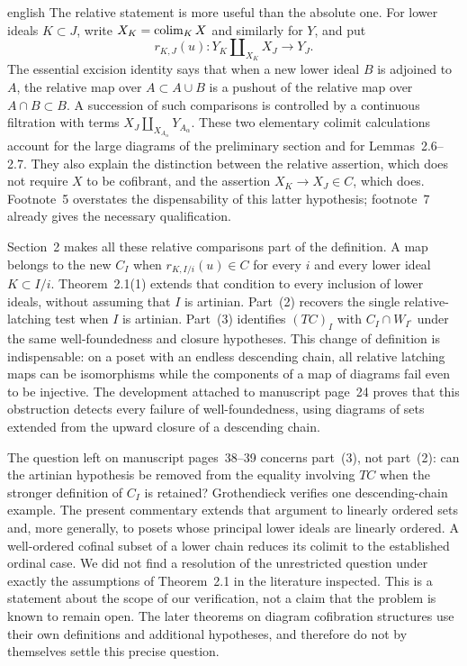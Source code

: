 \begin{otherlanguage*}{english}
The relative statement is more useful than the absolute one. For lower ideals $K\subset J$, write $X_K=\mathop{\rm colim}_{K}X$ and similarly for $Y$, and put
\[
 r_{K,J}(u):Y_K\amalg_{X_K}X_J\longrightarrow Y_J.
\]
The essential excision identity says that when a new lower ideal $B$ is adjoined to $A$, the relative map over $A\subset A\cup B$ is a pushout of the relative map over $A\cap B\subset B$. A succession of such comparisons is controlled by a continuous filtration with terms $X_J\amalg_{X_{A_\alpha}}Y_{A_\alpha}$. These two elementary colimit calculations account for the large diagrams of the preliminary section and for Lemmas~2.6--2.7. They also explain the distinction between the relative assertion, which does not require $X$ to be cofibrant, and the assertion $X_K\to X_J\in C$, which does. Footnote~5 overstates the dispensability of this latter hypothesis; footnote~7 already gives the necessary qualification.

Section~2 makes all these relative comparisons part of the definition. A map belongs to the new $C_I$ when $r_{K,I/i}(u)\in C$ for every $i$ and every lower ideal $K\subset I/i$. Theorem~2.1(1) extends that condition to every inclusion of lower ideals, without assuming that $I$ is artinian. Part~(2) recovers the single relative-latching test when $I$ is artinian. Part~(3) identifies $(TC)_I$ with $C_I\cap W_{I^\circ}$ under the same well-foundedness and closure hypotheses. This change of definition is indispensable: on a poset with an endless descending chain, all relative latching maps can be isomorphisms while the components of a map of diagrams fail even to be injective. The development attached to manuscript page~24 proves that this obstruction detects every failure of well-foundedness, using diagrams of sets extended from the upward closure of a descending chain.

The question left on manuscript pages~38--39 concerns part~(3), not part~(2): can the artinian hypothesis be removed from the equality involving $TC$ when the stronger definition of $C_I$ is retained? Grothendieck verifies one descending-chain example. The present commentary extends that argument to linearly ordered sets and, more generally, to posets whose principal lower ideals are linearly ordered. A well-ordered cofinal subset of a lower chain reduces its colimit to the established ordinal case. We did not find a resolution of the unrestricted question under exactly the assumptions of Theorem~2.1 in the literature inspected. This is a statement about the scope of our verification, not a claim that the problem is known to remain open. The later theorems on diagram cofibration structures use their own definitions and additional hypotheses, and therefore do not by themselves settle this precise question.


\end{otherlanguage*}
